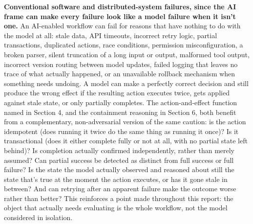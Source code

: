 \textbf{Conventional software and distributed-system failures, since the AI frame can make every failure look like a model failure when it isn't one.} An AI-enabled workflow can fail for reasons that have nothing to do with the model at all: stale data, API timeouts, incorrect retry logic, partial transactions, duplicated actions, race conditions, permission misconfiguration, a broken parser, silent truncation of a long input or output, malformed tool output, incorrect version routing between model updates, failed logging that leaves no trace of what actually happened, or an unavailable rollback mechanism when something needs undoing. A model can make a perfectly correct decision and still produce the wrong effect if the resulting action executes twice, gets applied against stale state, or only partially completes. The action-and-effect function named in Section 4, and the containment reasoning in Section 6, both benefit from a complementary, non-adversarial version of the same caution: is the action idempotent (does running it twice do the same thing as running it once)? Is it transactional (does it either complete fully or not at all, with no partial state left behind)? Is completion actually confirmed independently, rather than merely assumed? Can partial success be detected as distinct from full success or full failure? Is the state the model actually observed and reasoned about still the state that's true at the moment the action executes, or has it gone stale in between? And can retrying after an apparent failure make the outcome worse rather than better? This reinforces a point made throughout this report: the object that actually needs evaluating is the whole workflow, not the model considered in isolation.

